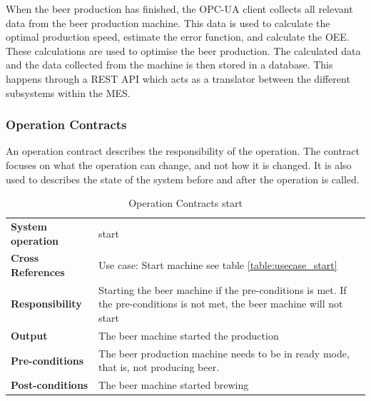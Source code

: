 When the beer production has finished, the OPC-UA client collects all relevant
data from the beer production machine. This data is used to calculate the
optimal production speed, estimate the error function, and calculate the OEE.
These calculations are used to optimise the beer production. The calculated data
and the data collected from the machine is then stored in a database. This
happens through a REST API which acts as a translator between the different 
subsystems within the MES.


\subsubsection{Operation Contracts}
An operation contract describes the responsibility of the operation. 
The contract focuses on what the operation can change, and not how it is changed. 
It is also used to describes the state of the system before and after the 
operation is called.
\begin{table}[H]
    \begin{tabularx}{\textwidth}{|>{\RaggedRight}p{3.7cm}|>{\RaggedRight}X|}
        \hline
        \multicolumn{2}{|c|}{\textbf{start}}\\
        \hline
        \textbf{System operation} & start\\
        \hline
        \textbf{Cross References} & Use case: Start machine see table \ref{table:usecase_start} \\
        \hline
        \textbf{Responsibility} & Starting the beer machine if the pre-conditions 
        is met.
            If the pre-conditions is not met, the beer machine will not start \\
        \hline
        \textbf{Output} & The beer machine started the production\\
        \hline
        \textbf{Pre-conditions} & 
            The beer production machine needs to be in
            ready mode, that is, not producing beer. \\
        \hline
        \textbf{Post-conditions} & The beer machine started brewing\\
        \hline
    \end{tabularx}
    \caption{Operation Contracts start} 
    \label{table:Operation_Contracts_start}
\end{table}

